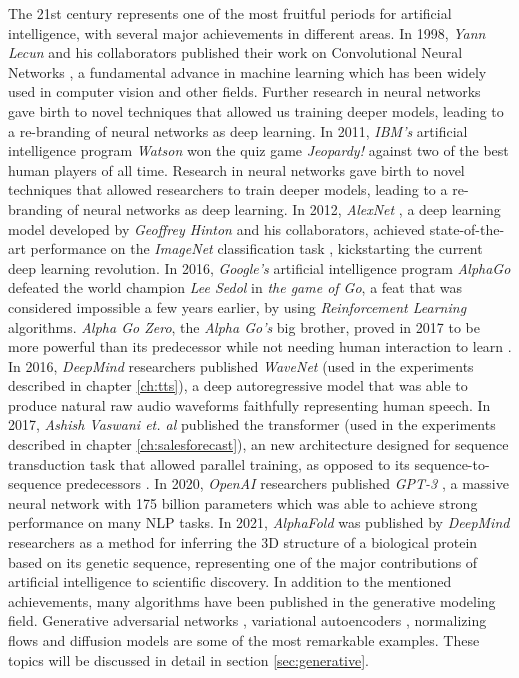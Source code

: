 The 21st century represents one of the most fruitful periods for artificial intelligence, with several major achievements in different areas. In 1998, \textit{Yann Lecun} and his collaborators published their work on Convolutional Neural Networks \autocite{lecun1999}, a fundamental advance in machine learning which has been widely used in computer vision and other fields. Further research in neural networks \autocite{hinton2006, hinton2012} gave birth to novel techniques that allowed us training deeper models, leading to a re-branding of neural networks as deep learning. In 2011, \textit{IBM's} artificial intelligence program \textit{Watson} won the quiz game \textit{Jeopardy!} against two of the best human players of all time. Research in neural networks gave birth to novel techniques that allowed researchers to train deeper models, leading to a re-branding of neural networks as deep learning. In 2012, \textit{AlexNet} \autocite{krizhevsky2012}, a deep learning model developed by \textit{Geoffrey Hinton} and his collaborators, achieved state-of-the-art performance on the \textit{ImageNet} classification task \autocite{ILSVRC15}, kickstarting the current deep learning revolution. In 2016, \textit{Google's} artificial intelligence program \textit{AlphaGo} \autocite{silver2016} defeated the world champion \textit{Lee Sedol} in \textit{the game of Go}, a feat that was considered impossible a few years earlier, by using \textit{Reinforcement Learning} algorithms. \textit{Alpha Go Zero}, the \textit{Alpha Go's} big brother, proved in 2017 to be more powerful than its predecessor while not needing human interaction to learn \autocite{Silver2017a, Silver2017b}. In 2016, \textit{DeepMind} researchers published \textit{WaveNet} \autocite{vanderoord2016} (used in the experiments described in chapter \ref{ch:tts}), a deep autoregressive model that was able to produce natural raw audio waveforms faithfully representing human speech. In 2017, \textit{Ashish Vaswani et. al} published the transformer \autocite{vaswani2017} (used in the experiments described in chapter \ref{ch:salesforecast}), an new architecture designed for sequence transduction task that allowed parallel training, as opposed to its sequence-to-sequence predecessors \autocite{sutskever2014}. In 2020, \textit{OpenAI} researchers published \textit{GPT-3} \autocite{brown2020}, a massive neural network with 175 billion parameters which was able to achieve strong performance on many NLP tasks. In 2021, \textit{AlphaFold} was published by \textit{DeepMind} researchers \autocite{Jumper2021} as a method for inferring the 3D structure of a biological protein based on its genetic sequence, representing one of the major contributions of artificial intelligence to scientific discovery. In addition to the mentioned achievements, many algorithms have been published in the generative modeling field. Generative adversarial networks \autocite{Goodfellow2014}, variational autoencoders \autocite{kingma2019}, normalizing flows \autocite{kingma2016, kobyzev} and diffusion models \autocite{Prafulla2021} are some of the most remarkable examples. These topics will be discussed in detail in section \ref{sec:generative}.

